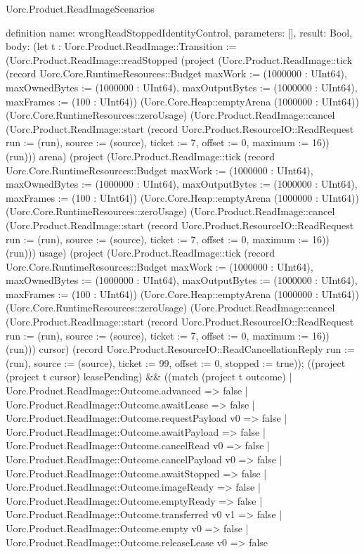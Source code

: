 \begin{lexlean}{Uorc.Product.ReadImageScenarios}
\begin{semanticmodule}
definition{
  name: wrongReadStoppedIdentityControl,
  parameters: [],
  result: Bool,
  body: (let t : Uorc.Product.ReadImage::Transition := (Uorc.Product.ReadImage::readStopped (project (Uorc.Product.ReadImage::tick (record Uorc.Core.RuntimeResources::Budget {maxWork := (1000000 : UInt64), maxOwnedBytes := (1000000 : UInt64), maxOutputBytes := (1000000 : UInt64), maxFrames := (100 : UInt64)}) (Uorc.Core.Heap::emptyArena (1000000 : UInt64)) (Uorc.Core.RuntimeResources::zeroUsage) (Uorc.Product.ReadImage::cancel (Uorc.Product.ReadImage::start (record Uorc.Product.ResourceIO::ReadRequest {run := (run), source := (source), ticket := 7, offset := 0, maximum := 16})) (run))) arena) (project (Uorc.Product.ReadImage::tick (record Uorc.Core.RuntimeResources::Budget {maxWork := (1000000 : UInt64), maxOwnedBytes := (1000000 : UInt64), maxOutputBytes := (1000000 : UInt64), maxFrames := (100 : UInt64)}) (Uorc.Core.Heap::emptyArena (1000000 : UInt64)) (Uorc.Core.RuntimeResources::zeroUsage) (Uorc.Product.ReadImage::cancel (Uorc.Product.ReadImage::start (record Uorc.Product.ResourceIO::ReadRequest {run := (run), source := (source), ticket := 7, offset := 0, maximum := 16})) (run))) usage) (project (Uorc.Product.ReadImage::tick (record Uorc.Core.RuntimeResources::Budget {maxWork := (1000000 : UInt64), maxOwnedBytes := (1000000 : UInt64), maxOutputBytes := (1000000 : UInt64), maxFrames := (100 : UInt64)}) (Uorc.Core.Heap::emptyArena (1000000 : UInt64)) (Uorc.Core.RuntimeResources::zeroUsage) (Uorc.Product.ReadImage::cancel (Uorc.Product.ReadImage::start (record Uorc.Product.ResourceIO::ReadRequest {run := (run), source := (source), ticket := 7, offset := 0, maximum := 16})) (run))) cursor) (record Uorc.Product.ResourceIO::ReadCancellationReply {run := (run), source := (source), ticket := 99, offset := 0, stopped := true})); ((project (project t cursor) leasePending) && ((match (project t outcome)
    | Uorc.Product.ReadImage::Outcome.advanced => false
    | Uorc.Product.ReadImage::Outcome.awaitLease => false
    | Uorc.Product.ReadImage::Outcome.requestPayload v0 => false
    | Uorc.Product.ReadImage::Outcome.awaitPayload => false
    | Uorc.Product.ReadImage::Outcome.cancelRead v0 => false
    | Uorc.Product.ReadImage::Outcome.cancelPayload v0 => false
    | Uorc.Product.ReadImage::Outcome.awaitStopped => false
    | Uorc.Product.ReadImage::Outcome.imageReady => false
    | Uorc.Product.ReadImage::Outcome.emptyReady => false
    | Uorc.Product.ReadImage::Outcome.transferred v0 v1 => false
    | Uorc.Product.ReadImage::Outcome.empty v0 => false
    | Uorc.Product.ReadImage::Outcome.releaseLease v0 => false
}
\end{semanticmodule}
\end{lexlean}
